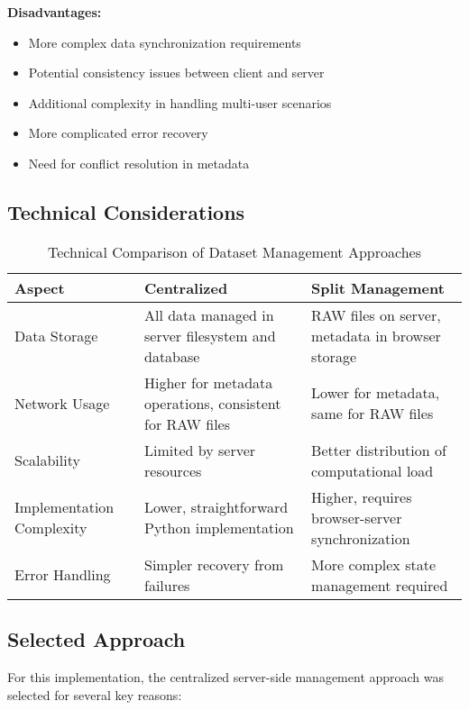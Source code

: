 \textbf{Disadvantages:}
\begin{itemize}
    \item More complex data synchronization requirements
    \item Potential consistency issues between client and server
    \item Additional complexity in handling multi-user scenarios
    \item More complicated error recovery
    \item Need for conflict resolution in metadata
\end{itemize}

\subsection{Technical Considerations}

\begin{table}[h]
\centering
\begin{tabular}{|p{3cm}|p{5cm}|p{5cm}|}
\hline
\textbf{Aspect} & \textbf{Centralized} & \textbf{Split Management} \\
\hline
Data Storage & All data managed in server filesystem and database & RAW files on server, metadata in browser storage \\
\hline
Network Usage & Higher for metadata operations, consistent for RAW files & Lower for metadata, same for RAW files \\
\hline
Scalability & Limited by server resources & Better distribution of computational load \\
\hline
Implementation Complexity & Lower, straightforward Python implementation & Higher, requires browser-server synchronization \\
\hline
Error Handling & Simpler recovery from failures & More complex state management required \\
\hline
\end{tabular}
\caption{Technical Comparison of Dataset Management Approaches}
\label{table:dataset_comparison}
\end{table}

\subsection{Selected Approach}

For this implementation, the centralized server-side management approach was selected for several key reasons:


